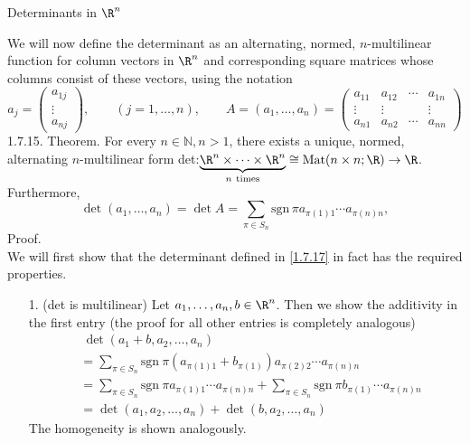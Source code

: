 \documentclass[smaller,hyperref={CJKbookmarks=true}]{beamer}
\newcommand{\N}{\mathbb{N}}
\begin{document}
\begin{frame}{Determinants in $\R^n$}
\begin{spacing}{1.05}
We will now define the determinant as an alternating, normed,
$n$-multilinear function for column vectors in $\R^n$ and corresponding square
matrices whose columns consist of these vectors, using the notation
\[a_j=\begin{pmatrix}
        a_{1j} \\
        \vdots \\
        a_{nj}
      \end{pmatrix},\qquad(j=1,\ldots,n),\qquad A=(a_1,\ldots,a_n)=\begin{pmatrix}
                           a_{11} & a_{12} & \cdots & a_{1n} \\
                           \vdots & \vdots &  & \vdots \\
                           a_{n1} & a_{n2} & \cdots & a_{nn}
                         \end{pmatrix}\]
\alert{1.7.15. Theorem.} For every $n\in\N,n>1$, there exists a unique, normed, alternating $n$-multilinear form det:$\underbrace{\R^n\times\cdots\times\R^n}_{n~\text{times}}\cong\text{Mat}(n\times n;\R)\to\R$.\\[7pt]
Furthermore,
\begin{equation}\label{1.7.17}
  \det(a_1,\ldots,a_n)=\det A=\sum_{\pi\in S_n}\text{sgn}\,\pi a_{\pi(1)1}\cdots a_{\pi(n)n},
\end{equation}
\newpage
\alert{Proof.}\\
We will first show that the determinant defined in \eqref{1.7.17} in fact has the required properties.
\begin{itemize}
  \item[1.] (det is multilinear) Let $a_1,\ldots,a_n,b\in\R^n$. Then we show the
additivity in the first entry (the proof for all other entries is completely analogous)
\begin{align*}
    &~\det(a_1+b,a_2,\ldots,a_n) \\
   &=\sum_{\pi\in S_n}\text{sgn}~\pi(a_{\pi(1)1}+b_{\pi(1)})a_{\pi(2)2}\cdots a_{\pi(n)n}  \\
   &=\sum_{\pi\in S_n}\text{sgn}~\pi a_{\pi(1)1}\cdots a_{\pi(n)n}+\sum_{\pi\in S_n}\text{sgn}~\pi b_{\pi(1)}\cdots a_{\pi(n)n}  \\
   &=\det(a_1,a_2,\ldots,a_n)+\det(b,a_2,\ldots,a_n)
\end{align*}
The homogeneity is shown analogously.
\end{itemize}

\end{spacing}
\end{frame}
\end{document}
